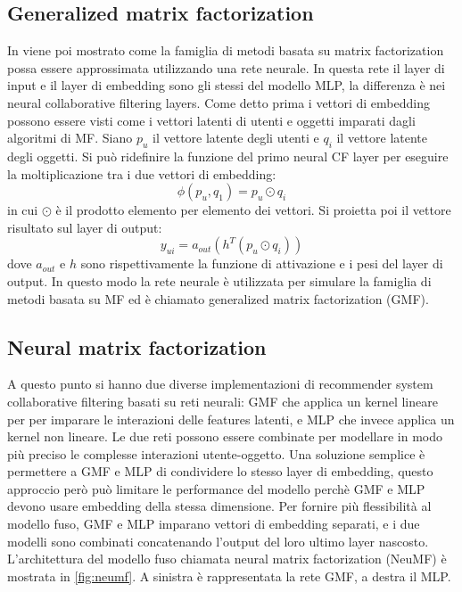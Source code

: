 \documentclass[12pt,italian]{report}
\begin{document}
\subsection{Generalized matrix factorization}
In \cite{NCF} viene poi mostrato come la famiglia di metodi basata su matrix factorization possa essere approssimata utilizzando una rete neurale. In questa rete il layer di input e il layer di embedding sono gli stessi del modello MLP, la differenza è nei neural collaborative filtering layers. Come detto prima i vettori di embedding possono essere visti come i vettori latenti di utenti e oggetti imparati dagli algoritmi di MF. Siano $p_u$ il vettore latente degli utenti e $q_i$ il vettore latente degli oggetti. Si può ridefinire la funzione del primo neural CF layer per eseguire la moltiplicazione tra i due vettori di embedding:
$$
\phi(p_u, q_1) = p_u \odot q_i
$$
in cui $\odot$ è il prodotto elemento per elemento dei vettori. Si proietta poi il vettore risultato sul layer di output:
$$
y_{ui} = a_{out}(h^T(p_u \odot q_i))
$$
dove $a_{out}$ e $h$ sono rispettivamente la funzione di attivazione e  i pesi del layer di output. In questo modo la rete neurale è utilizzata per simulare la famiglia di metodi basata su MF ed è chiamato generalized matrix factorization (GMF).

\subsection{Neural matrix factorization}
A questo punto si hanno due diverse implementazioni di recommender system collaborative filtering basati su reti neurali: GMF che applica un kernel lineare per per imparare le interazioni delle features latenti, e MLP che invece applica un kernel non lineare. Le due reti possono essere combinate per modellare in modo più preciso le complesse interazioni utente-oggetto. Una soluzione semplice è permettere a GMF e MLP di condividere lo stesso layer di embedding, questo approccio però può limitare le performance del modello perchè GMF e MLP devono usare embedding della stessa dimensione. Per fornire più flessibilità al modello fuso, GMF e MLP imparano vettori di embedding separati, e i due modelli sono combinati concatenando l'output del loro ultimo layer nascosto. L'architettura del modello fuso chiamata neural matrix factorization (NeuMF) è mostrata in \autoref{fig:neumf}. A sinistra è rappresentata la rete GMF, a destra il MLP.
\end{document}
